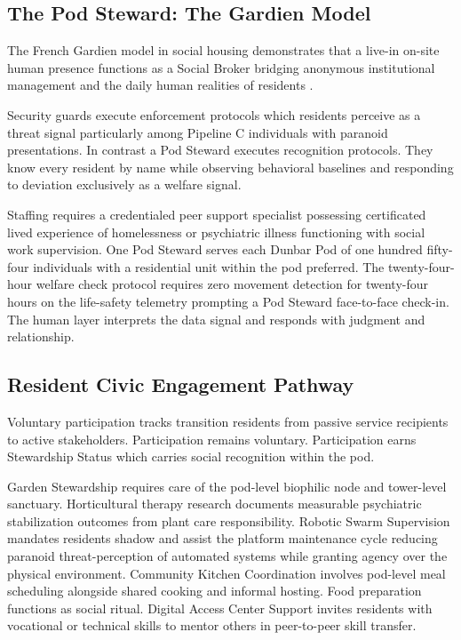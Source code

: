 \documentclass[12pt, letterpaper]{article}
\begin{document}
\subsection{The Pod Steward: The Gardien Model}

The French Gardien model in social housing demonstrates that a live-in on-site human presence functions as a Social Broker bridging anonymous institutional management and the daily human realities of residents \citep{harvard_gsd_gardien, tu_eindhoven_2024}.

Security guards execute enforcement protocols which residents perceive as a threat signal particularly among Pipeline C individuals with paranoid presentations. In contrast a Pod Steward executes recognition protocols. They know every resident by name while observing behavioral baselines and responding to deviation exclusively as a welfare signal.

Staffing requires a credentialed peer support specialist possessing certificated lived experience of homelessness or psychiatric illness functioning with social work supervision. One Pod Steward serves each Dunbar Pod of one hundred fifty-four individuals with a residential unit within the pod preferred. The twenty-four-hour welfare check protocol requires zero movement detection for twenty-four hours on the life-safety telemetry prompting a Pod Steward face-to-face check-in. The human layer interprets the data signal and responds with judgment and relationship.

\subsection{Resident Civic Engagement Pathway}

Voluntary participation tracks transition residents from passive service recipients to active stakeholders. Participation remains voluntary. Participation earns Stewardship Status which carries social recognition within the pod.

Garden Stewardship requires care of the pod-level biophilic node and tower-level sanctuary. Horticultural therapy research documents measurable psychiatric stabilization outcomes from plant care responsibility. Robotic Swarm Supervision mandates residents shadow and assist the platform maintenance cycle reducing paranoid threat-perception of automated systems while granting agency over the physical environment. Community Kitchen Coordination involves pod-level meal scheduling alongside shared cooking and informal hosting. Food preparation functions as social ritual. Digital Access Center Support invites residents with vocational or technical skills to mentor others in peer-to-peer skill transfer.
\end{document}
